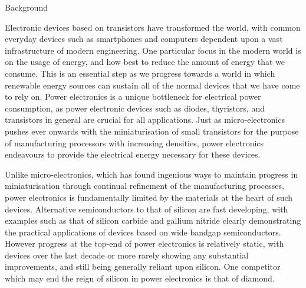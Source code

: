 \begin{refsection}
\begin{introduction}
\begin{section}{Background}
{
Electronic devices based on transistors have transformed the world, with common everyday devices such as smartphones and computers dependent upon a vast infrastructure of modern engineering. One particular focus in the modern world is on the usage of energy, and how best to reduce the amount of energy that we consume. This is an essential step as we progress towards a world in which renewable energy sources can sustain all of the normal devices that we have come to rely on. Power electronics is a unique bottleneck for electrical power consumption, as power electronic devices such as diodes, thyristors, and transistors in general are crucial for all applications. Just as micro-electronics pushes ever onwards with the miniaturisation of small transistors for the purpose of manufacturing processors with increasing densities, power electronics endeavours to provide the electrical energy necessary for these devices. 

Unlike micro-electronics, which has found ingenious ways to maintain progress in miniaturisation through continual refinement of the manufacturing processes, power electronics is fundamentally limited by the materials at the heart of such devices. Alternative semiconductors to that of silicon are fast developing, with examples such as that of silicon carbide and gallium nitride clearly demonstrating the practical applications of devices based on wide bandgap semiconductors. However progress at the top-end of power electronics is relatively static, with devices over the last decade or more rarely showing any substantial improvements, and still being generally reliant upon silicon. One competitor which may end the reign of silicon in power electronics is that of diamond. 

}
\end{section}
\end{introduction}
\end{refsection}
